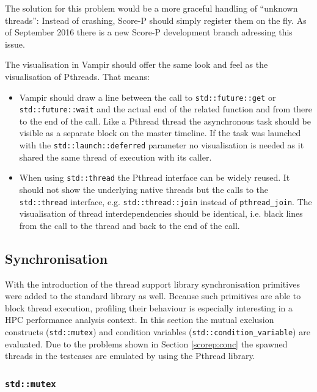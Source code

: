 The solution for this problem would be a more graceful handling of ``unknown threads'': Instead of crashing, Score-P should simply register them on the fly. As of September 2016 there is a new Score-P development branch adressing this issue.

The visualisation in Vampir should offer the same look and feel as the visualisation of Pthreads. That means:

\begin{itemize}
\item Vampir should draw a line between the call to \texttt{std::future::get} or \texttt{std::future::wait} and the actual end of the related function and from there to the end of the call. Like a Pthread thread the asynchronous task should be visible as a separate block on the master timeline. If the task was launched with the \texttt{std::launch::deferred} parameter no visualisation is needed as it shared the same thread of execution with its caller.
\item When using \texttt{std::thread} the Pthread interface can be widely reused. It should not show the underlying native threads but the calls to the \texttt{std::thread} interface, e.g. \texttt{std::thread::join} instead of \texttt{pthread\_join}. The visualisation of thread interdependencies should be identical, i.e. black lines from the call to the thread and back to the end of the call.
\end{itemize}

\subsection{Synchronisation}

With the introduction of the thread support library synchronisation primitives were added to the standard library as well. Because such primitives are able to block thread execution, profiling their behaviour is especially interesting in a HPC performance analysis context. In this section the mutual exclusion constructs (\texttt{std::mutex}) and condition variables (\texttt{std::condition\_variable}) are evaluated. Due to the problems shown in Section \ref{scorep:conc} the spawned threads in the testcases are emulated by using the Pthread library.

\subsubsection{\texttt{std::mutex}}\label{scorep:sync:mutex}


